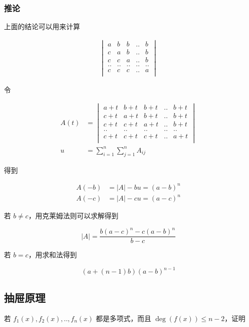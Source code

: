 \documentclass[12pt,a4paper]{ctexart}
\begin{document}
\subsubsection{推论}

上面的结论可以用来计算

\begin{align*}
    \begin{vmatrix}
        a & b & b & .. & b\\
        c & a & b & .. & b\\
        c & c & a & .. & b\\
        .. & .. & .. & .. & ..\\
        c & c & c & .. & a\\
    \end{vmatrix}
\end{align*}

令 

\begin{align*}
A(t) &= \begin{vmatrix}
        a + t& b + t& b + t& .. & b + t\\
        c + t& a + t& b + t& .. & b +t \\
        c + t& c + t & a + t & .. & b + t \\
        .. & .. & .. & .. & ..\\
        c + t& c + t& c + t& .. & a + t\\
    \end{vmatrix} \\
u &= \sum_{i=1}^{n}\sum_{j=1}^{n}A_{ij}
\end{align*}

得到

\begin{align*}
A(-b) &= \lvert  A \rvert - bu = (a-b)^n\\
A(-c) &= \lvert A \rvert - cu  = (a-c)^n
\end{align*}

若 $b \ne c$，用克莱姆法则可以求解得到

\[
\lvert A \rvert = \frac{b(a-c)^n - c(a-b)^n}{b-c}
\]

若 $b = c$，用求和法得到

\[
(a+(n-1)b) (a-b)^{n-1}
\]

\subsection{抽屉原理}

若 $f_1(x),f_2(x),..,f_n(x)$ 都是多项式，而且 $\deg (f(x)) \le n-2$，证明
\end{document}
